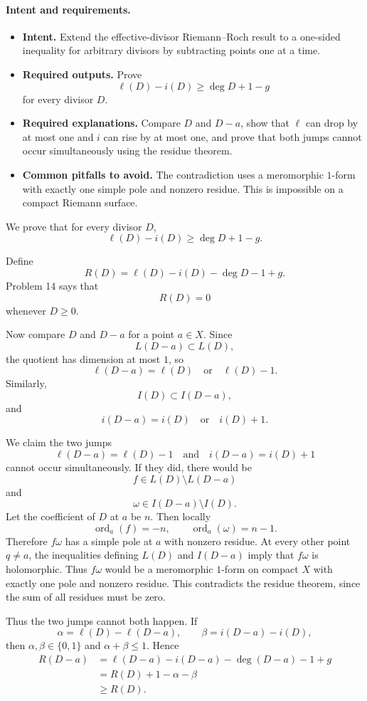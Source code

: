 \documentclass[11pt]{article}
\newcommand{\ord}{\operatorname{ord}}
\newenvironment{intentrequirements}{%
\paragraph{Intent and requirements.}
\begin{itemize}[leftmargin=*, itemsep=0.25em]
}{%
\end{itemize}
}
\begin{document}
\begin{intentrequirements}
\item \textbf{Intent.} Extend the effective-divisor Riemann--Roch result to a one-sided inequality for arbitrary divisors by subtracting points one at a time.
\item \textbf{Required outputs.} Prove
\[
 \ell(D)-i(D)\geq\deg D+1-g
\]
for every divisor $D$.
\item \textbf{Required explanations.} Compare $D$ and $D-a$, show that $\ell$ can drop by at most one and $i$ can rise by at most one, and prove that both jumps cannot occur simultaneously using the residue theorem.
\item \textbf{Common pitfalls to avoid.} The contradiction uses a meromorphic $1$-form with exactly one simple pole and nonzero residue. This is impossible on a compact Riemann surface.
\end{intentrequirements}

We prove that for every divisor $D$,
\[
 \ell(D)-i(D)\geq \deg D+1-g.
\]

Define
\[
 R(D)=\ell(D)-i(D)-\deg D-1+g.
\]
Problem 14 says that
\[
 R(D)=0
\]
whenever $D\geq0$.

Now compare $D$ and $D-a$ for a point $a\in X$. Since
\[
 L(D-a)\subset L(D),
\]
the quotient has dimension at most $1$, so
\[
 \ell(D-a)=\ell(D)\quad\text{or}\quad \ell(D)-1.
\]
Similarly,
\[
 I(D)\subset I(D-a),
\]
and
\[
 i(D-a)=i(D)\quad\text{or}\quad i(D)+1.
\]

We claim the two jumps
\[
 \ell(D-a)=\ell(D)-1
 \quad\text{and}\quad
 i(D-a)=i(D)+1
\]
cannot occur simultaneously.
If they did, there would be
\[
 f\in L(D)\setminus L(D-a)
\]
and
\[
 \omega\in I(D-a)\setminus I(D).
\]
Let the coefficient of $D$ at $a$ be $n$. Then locally
\[
 \ord_a(f)=-n,\qquad \ord_a(\omega)=n-1.
\]
Therefore $f\omega$ has a simple pole at $a$ with nonzero residue. At every other point $q\neq a$, the inequalities defining $L(D)$ and $I(D-a)$ imply that $f\omega$ is holomorphic. Thus $f\omega$ would be a meromorphic $1$-form on compact $X$ with exactly one pole and nonzero residue. This contradicts the residue theorem, since the sum of all residues must be zero.

Thus the two jumps cannot both happen. If
\[
 \alpha=\ell(D)-\ell(D-a),\qquad
 \beta=i(D-a)-i(D),
\]
then $\alpha,\beta\in\{0,1\}$ and $\alpha+\beta\leq1$. Hence
\[
\begin{aligned}
 R(D-a)
 &=\ell(D-a)-i(D-a)-\deg(D-a)-1+g\\
 &=R(D)+1-\alpha-\beta\\
 &\geq R(D).
\end{aligned}
\]
\end{document}
